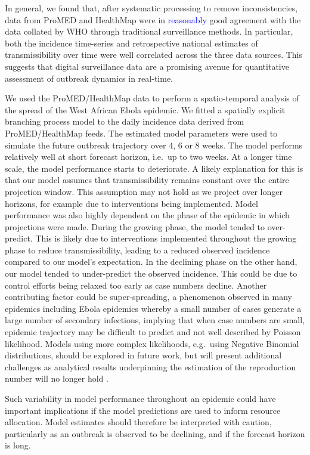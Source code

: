 \documentclass[9pt,twocolumn,twoside,lineno]{pnas-new}
\newcommand{\sangeeta}[1]{\textcolor{blue}{#1}}
\begin{document}
In general, we found that, after systematic processing to remove
inconsistencies, data from ProMED and HealthMap were in
\sangeeta{reasonably} good agreement
with the data collated by WHO through traditional surveillance methods.
In particular, both the incidence time-series and retrospective national
estimates of transmissibility over time were well correlated across the
three data sources. This suggests that digital surveillance data are a
promising avenue for quantitative assessment of
outbreak dynamics in real-time. 

We used the ProMED/HealthMap data to perform a spatio-temporal analysis
of the spread of the West African Ebola epidemic. We fitted a spatially
explicit branching process model to the daily incidence data derived
from ProMED/HealthMap feeds. The estimated model parameters were used to
simulate the future outbreak trajectory over 4, 6 or 8 weeks. The model
performs relatively well at short forecast horizon, i.e.~up to
two weeks. At a
longer time scale, the model performance starts to deteriorate. A likely
explanation for this is that our model assumes that transmissibility
remains constant over the entire projection window. This assumption may
not hold as we project over longer horizons, for example due to
interventions being implemented. Model performance was also highly
dependent on the phase of the epidemic in which projections were made.
During the growing phase, the model tended to over-predict. This is
likely due to interventions implemented throughout the growing phase to
reduce transmissibility, leading to a reduced observed incidence
compared to our model's expectation. In the declining phase on the other
hand, our model tended to under-predict the observed incidence. This
could be due to control efforts being relaxed too early as case
numbers decline. Another contributing factor could be super-spreading,
a phenomenon observed in many
epidemics including Ebola epidemics \cite{lau2017spatial,
  agua2016exposure}
whereby a small number of cases generate a large
number of secondary infections, implying that when case numbers are
small, epidemic trajectory may be difficult to predict and not well
described by Poisson likelihood. Models using more complex likelihoods,
e.g.~using Negative Binomial distributions, should be explored in future
work, but will present additional challenges as analytical results
underpinning the estimation of the reproduction number will no longer
hold \cite{cori2013new}.

Such variability in model performance throughout an epidemic could have
important implications if the model predictions are used to inform
resource allocation. Model estimates should therefore be interpreted
with caution, particularly as an outbreak is observed to be declining,
and if the forecast horizon is long.
\end{document}
